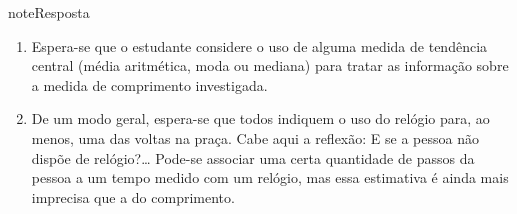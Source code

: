 \begin{sphinxadmonition}{note}{Resposta}
\begin{enumerate}
\item {} 
Espera-se que o estudante considere o uso de alguma medida de tendência central (média aritmética, moda ou mediana) para tratar as informação sobre a medida de comprimento investigada.

\item {} 
De um modo geral, espera-se que todos indiquem o uso do relógio para, ao menos, uma das voltas na praça. Cabe aqui a reflexão: E se a pessoa não dispõe de relógio?… Pode-se associar uma certa quantidade de passos da pessoa a um tempo medido com um relógio, mas essa estimativa é ainda mais imprecisa que a do comprimento.

\end{enumerate}
\end{sphinxadmonition}
\label{\detokenize{NO103-0:ativ-nome-do-capitulo-nome-da-atividade}}
